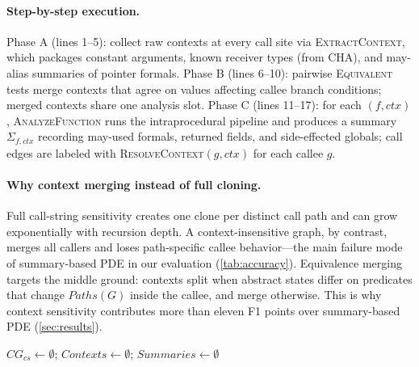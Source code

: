 \documentclass[acmsmall,screen,review,anonymous]{acmart}
\begin{document}
\paragraph{Step-by-step execution.}
Phase A (lines 1--5): collect raw contexts at every call site via \textsc{ExtractContext}, which packages constant arguments, known receiver types (from CHA), and may-alias summaries of pointer formals. Phase B (lines 6--10): pairwise \textsc{Equivalent} tests merge contexts that agree on values affecting callee branch conditions; merged contexts share one analysis slot. Phase C (lines 11--17): for each $(f,ctx)$, \textsc{AnalyzeFunction} runs the intraprocedural pipeline and produces a summary $\Sigma_{f,ctx}$ recording may-used formals, returned fields, and side-effected globals; call edges are labeled with \textsc{ResolveContext}$(g,ctx)$ for each callee $g$.

\paragraph{Why context merging instead of full cloning.}
Full call-string sensitivity creates one clone per distinct call path and can grow exponentially with recursion depth. A context-insensitive graph, by contrast, merges all callers and loses path-specific callee behavior---the main failure mode of summary-based PDE in our evaluation (\autoref{tab:accuracy}). Equivalence merging targets the middle ground: contexts split when abstract states differ on predicates that change $\mathit{Paths}(G)$ inside the callee, and merge otherwise. This is why context sensitivity contributes more than eleven F1 points over summary-based PDE (\autoref{sec:results}).

\begin{algobox}
\begin{algorithm}[H]
\SetAlgoLined
{}
$CG_{cs}\leftarrow\emptyset$;\;
$Contexts\leftarrow\emptyset$;\;
$Summaries\leftarrow\emptyset$\;
\;
\caption{Context-sensitive call-graph construction with equivalence merging.}
\label{alg:callgraph}
\end{algorithm}
\end{algobox}
\end{document}
